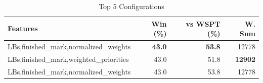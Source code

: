 \begin{table}[htbp]%
\centering%
\begin{tabular}{lrrr}%
\toprule%
\textbf{Features}&\textbf{Win (\%)}&\textbf{vs WSPT (\%)}&\textbf{W. Sum}\\%
\midrule%
LBs,finished_mark,normalized_weights&\textbf{43.0}&\textbf{53.8}&12778\\%
LBs,finished_mark,weighted_priorities&43.0&51.8&\textbf{12902}\\%
LBs,finished_mark,normalized_weights&43.0&53.8&12778\\%
\bottomrule%
\end{tabular}%
\caption{Top 5 Configurations}%
\label{tab:summary}%
\end{table}